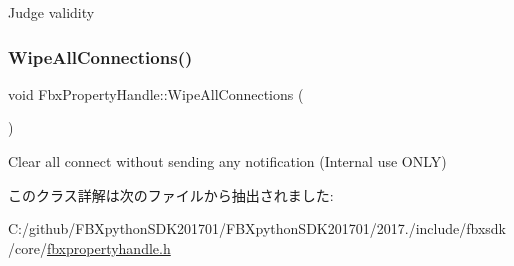 Judge validity 

\mbox{\label{class_fbx_property_handle_abac85431f7a869fe1cf8a8cb1e8097ec}} 
\subsubsection{\texorpdfstring{Wipe\+All\+Connections()}{WipeAllConnections()}}
{\footnotesize\ttfamily void Fbx\+Property\+Handle\+::\+Wipe\+All\+Connections (\begin{DoxyParamCaption}{ }\end{DoxyParamCaption})}



Clear all connect without sending any notification (Internal use O\+N\+LY) 



このクラス詳解は次のファイルから抽出されました\+:\begin{DoxyCompactItemize}
\item 
C\+:/github/\+F\+B\+Xpython\+S\+D\+K201701/\+F\+B\+Xpython\+S\+D\+K201701/2017./include/fbxsdk/core/\hyperlink{fbxpropertyhandle_8h}{fbxpropertyhandle.\+h}\end{DoxyCompactItemize}
